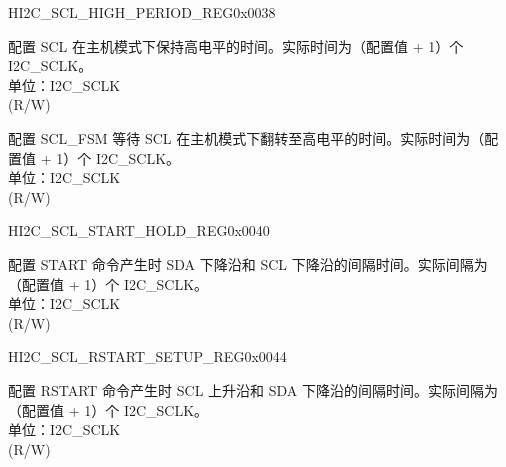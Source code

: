 \begin{register}{H}{I2C\_SCL\_HIGH\_PERIOD\_REG}{0x0038}\label{regdesc:I2CSCLHIGHPERIODREG}
%
%
%
\regnewline%
\begin{regdesc}\begin{reglist}
\label{fielddesc:I2CSCLHIGHPERIOD}\item [I2C\_SCL\_HIGH\_PERIOD] 配置 SCL 在主机模式下保持高电平的时间。实际时间为（配置值 + 1）个 I2C\_SCLK。\\
单位：I2C\_SCLK \\ (R/W)
\label{fielddesc:I2CSCLWAITHIGHPERIOD}\item [I2C\_SCL\_WAIT\_HIGH\_PERIOD] 配置 SCL\_FSM 等待 SCL 在主机模式下翻转至高电平的时间。实际时间为（配置值 + 1）个 I2C\_SCLK。\\
单位：I2C\_SCLK \\ (R/W)
\end{reglist}\end{regdesc}
\end{register}


\begin{register}{H}{I2C\_SCL\_START\_HOLD\_REG}{0x0040}\label{regdesc:I2CSCLSTARTHOLDREG}
%
%
\regnewline%
\begin{regdesc}\begin{reglist}
\label{fielddesc:I2CSCLSTARTHOLDTIME}\item [I2C\_SCL\_START\_HOLD\_TIME] 配置 START 命令产生时 SDA 下降沿和 SCL 下降沿的间隔时间。实际间隔为（配置值 + 1）个 I2C\_SCLK。\\
单位：I2C\_SCLK \\ (R/W)
\end{reglist}\end{regdesc}
\end{register}


\begin{register}{H}{I2C\_SCL\_RSTART\_SETUP\_REG}{0x0044}\label{regdesc:I2CSCLRSTARTSETUPREG}
%
%
\regnewline%
\begin{regdesc}\begin{reglist}
\label{fielddesc:I2CSCLRSTARTSETUPTIME}\item [I2C\_SCL\_RSTART\_SETUP\_TIME] 配置 RSTART 命令产生时 SCL 上升沿和 SDA 下降沿的间隔时间。实际间隔为（配置值 + 1）个 I2C\_SCLK。\\
单位：I2C\_SCLK \\ (R/W)
\end{reglist}\end{regdesc}
\end{register}


